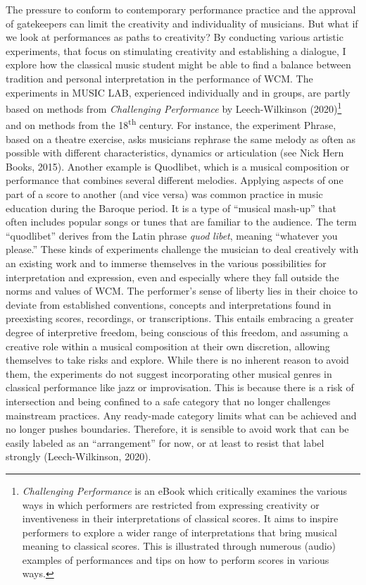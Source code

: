\documentclass[authordate, empirical, issue]{jote-new-article}
\begin{document}
The pressure to conform to contemporary performance practice and the approval of gatekeepers can limit the creativity and individuality of musicians. But what if we look at performances as paths to creativity? By conducting various artistic experiments, that focus on stimulating creativity and establishing a dialogue, I explore how the classical music student might be able to find a balance between tradition and personal interpretation in the performance of WCM. The experiments in MUSIC LAB, experienced individually and in groups, are partly based on methods from \emph{Challenging Performance} by Leech-Wilkinson (2020)\footnote{\emph{Challenging Performance} is an eBook which critically examines the various ways in which performers are restricted from expressing creativity or inventiveness in their interpretations of classical scores. It aims to inspire performers to explore a wider range of interpretations that bring musical meaning to classical scores. This is illustrated through numerous (audio) examples of performances and tips on how to perform scores in various ways.} and on methods from the 18\textsuperscript{th} century. For instance, the experiment Phrase, based on a theatre exercise, asks musicians rephrase the same melody as often as possible with different characteristics, dynamics or articulation (see Nick Hern Books, 2015). Another example is Quodlibet, which is a musical composition or performance that combines several different melodies. Applying aspects of one part of a score to another (and vice versa) was common practice in music education during the Baroque period. It is a type of “musical mash-up” that often includes popular songs or tunes that are familiar to the audience. The term “quodlibet” derives from the Latin phrase \emph{quod}\emph{ }\emph{libet}, meaning “whatever you please.” These kinds of experiments challenge the musician to deal creatively with an existing work and to immerse themselves in the various possibilities for interpretation and expression, even and especially where they fall outside the norms and values of WCM. The performer's sense of liberty lies in their choice to deviate from established conventions, concepts and interpretations found in preexisting scores, recordings, or transcriptions. This entails embracing a greater degree of interpretive freedom, being conscious of this freedom, and assuming a creative role within a musical composition at their own discretion, allowing themselves to take risks and explore. While there is no inherent reason to avoid them, the experiments do not suggest incorporating other musical genres in classical performance like jazz or improvisation. This is because there is a risk of intersection and being confined to a safe category that no longer challenges mainstream practices. Any ready-made category limits what can be achieved and no longer pushes boundaries. Therefore, it is sensible to avoid work that can be easily labeled as an “arrangement” for now, or at least to resist that label strongly (Leech-Wilkinson, 2020).
\end{document}
